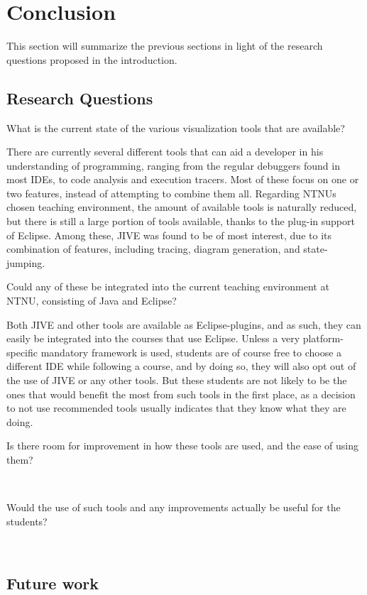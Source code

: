 \section{Conclusion}\label{conclusion}
This section will summarize the previous sections in light of the research questions proposed in the introduction.

\subsection{Research Questions}\label{conclusionRQs}


\begin{theorem}
What is the current state of the various visualization tools that are available?
\end{theorem}
There are currently several different tools that can aid a developer in his understanding of programming, ranging from the regular debuggers found in most IDEs, to code analysis and execution tracers.
Most of these focus on one or two features, instead of attempting to combine them all.
Regarding NTNUs chosen teaching environment, the amount of available tools is naturally reduced, but there is still a large portion of tools available, thanks to the plug-in support of Eclipse.
Among these, JIVE was found to be of most interest, due to its combination of features, including tracing, diagram generation, and state-jumping.
~\\

\begin{theorem}
Could any of these be integrated into the current teaching environment at NTNU, consisting of Java and Eclipse?
\end{theorem}
Both JIVE and other tools are available as Eclipse-plugins, and as such, they can easily be integrated into the courses that use Eclipse.
Unless a very platform-specific mandatory framework is used, students are of course free to choose a different IDE while following  a course, and by doing so, they will also opt out of the use of JIVE or any other tools.
But these students are not likely to be the ones that would benefit the most from such tools in the first place, as a decision to not use recommended tools usually indicates that they know what they are doing. %
~\\

\begin{theorem}
Is there room for improvement in how these tools are used, and the ease of using them?
\end{theorem}
~\\

\begin{theorem}
Would the use of such tools and any improvements actually be useful for the students?
\end{theorem}
~\\

\subsection{Future work}\label{conclusionFuture}
